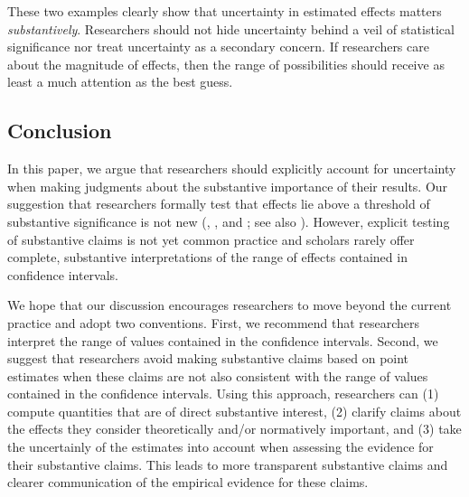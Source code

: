 \documentclass[12pt]{article}
\begin{document}
These two examples clearly show that uncertainty in estimated effects matters \textit{substantively}. Researchers should not hide uncertainty behind a veil of statistical significance nor treat uncertainty as a secondary concern. If researchers care about the magnitude of effects, then the range of possibilities should receive as least a much attention as the best guess.

\subsection*{Conclusion}

In this paper, we argue that researchers should explicitly account for uncertainty when making judgments about the substantive importance of their results. Our suggestion that researchers formally test that effects lie above a threshold of substantive significance is not new (\citealt{Achen1982}, \citealt{Rainey2014a}, and \citealt{Gross2014}; see also \citealt{EsareyDanneman2014}). However, explicit testing of substantive claims is not yet common practice and scholars rarely offer complete, substantive interpretations of the range of effects contained in confidence intervals. 

We hope that our discussion encourages researchers to move beyond the current practice and adopt two conventions. First, we recommend that researchers interpret the range of values contained in the confidence intervals. Second, we suggest that researchers avoid making substantive claims based on point estimates when these claims are not also consistent with the range of values contained in the confidence intervals. Using this approach, researchers can (1) compute quantities that are of direct substantive interest, (2) clarify claims about the effects they consider theoretically and/or normatively important, and (3) take the uncertainly of the estimates into account when assessing the evidence for their substantive claims. This leads to more transparent substantive claims and clearer communication of the empirical evidence for these claims.


\singlespace


%
\end{document}

